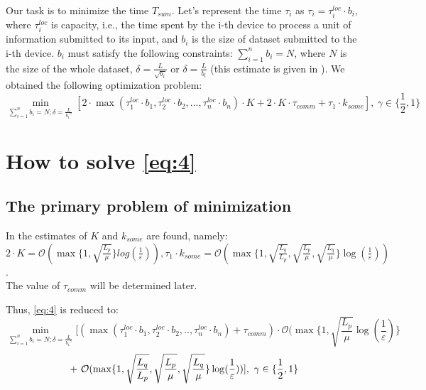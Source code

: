 \documentclass{article}
\begin{document}
Our task is to minimize the time $T_{sum}$. Let's represent the time $\tau_i$ as $\tau_i = \tau_i^{loc}\cdot b_i$, where $\tau_i^{loc}$ is capacity, i.e., the time spent by the i-th device to process a unit of information submitted to its input, and $b_i$ is the size of dataset submitted to the i-th device. $b_i$ must satisfy the following constraints: $\sum\limits_{i = 1}^{n} b_i = N$, where $N$ is the size of the whole dataset, $\delta = \frac{L}{\sqrt{b_i}}$ or $\delta = \frac{L}{b_i}$ (this estimate is given in \cite{kovalev2022optimal}).
We obtained the following optimization problem:
\begin{equation}
    \label{eq:4}
    \underset{\sum\limits_{i = 1}^{n} b_i = N; \delta = \frac{L}{{b_1}^{\gamma}}}{\min}[ 2\cdot\max(\tau_1^{loc}\cdot b_1, \tau_2^{loc}\cdot b_2, \ldots, \tau_n^{loc}\cdot b_n)\cdot K + 2\cdot K\cdot\tau_{comm} + \tau_1\cdot k_{some}], ~ \gamma \in \{\frac{1}{2}, 1\}
\end{equation}

\section{How to solve \eqref{eq:4}}

\subsection{The primary problem of minimization}
In \cite{kovalev2022optimal} the estimates of $K$ and $k_{some}$ are found, namely: \\ $2\cdot K = \mathcal O(\max\{1, \sqrt{\frac{L_p}{\mu}}\}log(\frac{1}{\varepsilon})), \tau_1\cdot k_{some} = \mathcal O(\max\{1, \sqrt{\frac{L_q}{L_p}}, \sqrt{\frac{L_p}{\mu}}, \sqrt{\frac{L_q}{\mu}}\}\log(\frac{1}{\varepsilon}))$. \\ The value of $\tau_{comm}$ will be determined later. 

Thus, \eqref{eq:4} is reduced to:
\begin{equation}
    \label{eq:5}
    \underset{\sum\limits_{i = 1}^{n} b_i = N; \delta = \frac{L}{{b_1}^\gamma}}{\min}[(\max(\tau_1^{loc}\cdot b_1, \tau_2^{loc}\cdot b_2, . ., \tau_n^{loc}\cdot b_n) + \tau_{comm}) \cdot \mathcal O(\max\{1, \sqrt{\frac{L_p}{\mu}}\log(\frac{1}{\varepsilon})\} 
\end{equation}
\begin{equation}
     \notag
     + ~
    \mathcal O(\max\{1,\sqrt{\frac{L_q}{L_p}}, \sqrt{\frac{L_p}{\mu}}, \sqrt{\frac{L_q}{\mu}}\}\log(\frac{1}{\varepsilon}))] ,  ~ \gamma \in \{\frac{1}{2}, 1\}
\end{equation}
\end{document}
